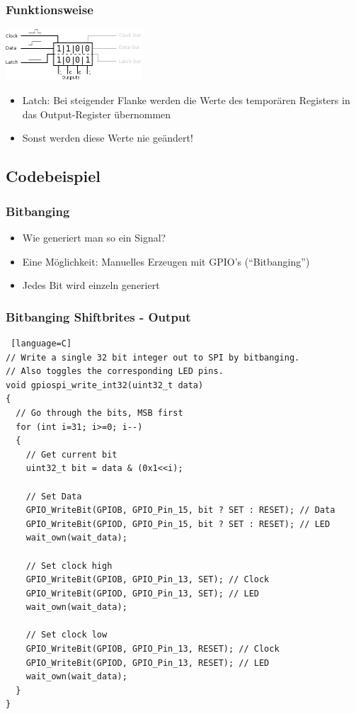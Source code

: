 \documentclass[ngerman,compress]{beamer}
\begin{document}
\begin{frame} [fragile]
	\frametitle{Funktionsweise}
	\includegraphics[width=2in]{07_shift.png}
	\begin{itemize}
		\item Latch: Bei steigender Flanke werden die Werte des temporären Registers in das
			Output-Register übernommen
		\item Sonst werden diese Werte nie geändert!
	\end{itemize}
\end{frame}


\subsection{Codebeispiel}

\begin{frame} [fragile]
	\frametitle{Bitbanging}
	\begin{itemize}
		\item Wie generiert man so ein Signal?
		\item Eine Möglichkeit: Manuelles Erzeugen mit GPIO's (``Bitbanging'')
		\item Jedes Bit wird einzeln generiert
	\end{itemize}
\end{frame}

\begin{frame} [fragile]
	\frametitle{Bitbanging Shiftbrites - Output}
	\begin{lstlisting} [language=C]
// Write a single 32 bit integer out to SPI by bitbanging.
// Also toggles the corresponding LED pins.
void gpiospi_write_int32(uint32_t data)
{
  // Go through the bits, MSB first
  for (int i=31; i>=0; i--)
  {
    // Get current bit
    uint32_t bit = data & (0x1<<i);
    
    // Set Data
    GPIO_WriteBit(GPIOB, GPIO_Pin_15, bit ? SET : RESET); // Data
    GPIO_WriteBit(GPIOD, GPIO_Pin_15, bit ? SET : RESET); // LED
    wait_own(wait_data);
    
    // Set clock high
    GPIO_WriteBit(GPIOB, GPIO_Pin_13, SET); // Clock
    GPIO_WriteBit(GPIOD, GPIO_Pin_13, SET); // LED
    wait_own(wait_data);
    
    // Set clock low
    GPIO_WriteBit(GPIOB, GPIO_Pin_13, RESET); // Clock
    GPIO_WriteBit(GPIOD, GPIO_Pin_13, RESET); // LED
    wait_own(wait_data);
  }
}
	\end{lstlisting}
\end{frame}
\end{document}
